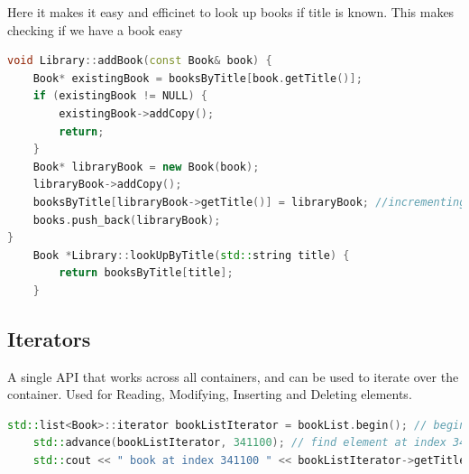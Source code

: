 \documentclass{report}
\begin{document}
Here it makes it easy and efficinet to look up books if title is known. This makes checking if we have a book easy

\begin{lstlisting}[language=C++]
void Library::addBook(const Book& book) {
	Book* existingBook = booksByTitle[book.getTitle()];
	if (existingBook != NULL) {
		existingBook->addCopy();
		return;
	}
	Book* libraryBook = new Book(book);
	libraryBook->addCopy();
	booksByTitle[libraryBook->getTitle()] = libraryBook; //incrementing size of our library has little overead as we are adding associations, not copies, and accesssing the same instances.
	books.push_back(libraryBook);
}
	Book *Library::lookUpByTitle(std::string title) {
		return booksByTitle[title];
	}

\end{lstlisting}
\subsection{Iterators}

A single API that works across all containers, and can be used to iterate over the container. Used for Reading, Modifying, Inserting and Deleting elements.

\begin{lstlisting}[language=C++]
	std::list<Book>::iterator bookListIterator = bookList.begin(); // begin initialises iterator
	std::advance(bookListIterator, 341100); // find element at index 341100
	std::cout << " book at index 341100 " << bookListIterator->getTitle() << std::endl; // get iterated element with pointer
\end{lstlisting}
\end{document}
